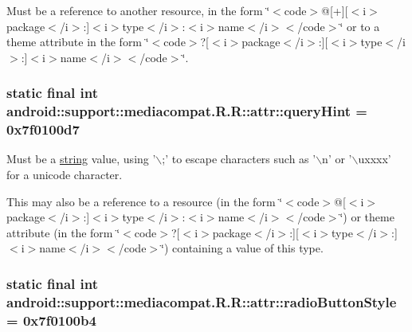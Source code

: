 Must be a reference to another resource, in the form \char`\"{}$<$code$>$@\mbox{[}+\mbox{]}\mbox{[}$<$i$>$package$<$/i$>$:\mbox{]}$<$i$>$type$<$/i$>$:$<$i$>$name$<$/i$>$$<$/code$>$\char`\"{} or to a theme attribute in the form \char`\"{}$<$code$>$?\mbox{[}$<$i$>$package$<$/i$>$:\mbox{]}\mbox{[}$<$i$>$type$<$/i$>$:\mbox{]}$<$i$>$name$<$/i$>$$<$/code$>$\char`\"{}. \hypertarget{classandroid_1_1support_1_1mediacompat_1_1_r_1_1attr_70d39ad74f326eb709e154ea70cea27a}{
\subsubsection[{queryHint}]{\setlength{\rightskip}{0pt plus 5cm}static final int android::support::mediacompat.R.R::attr::queryHint = 0x7f0100d7}}
\label{classandroid_1_1support_1_1mediacompat_1_1_r_1_1attr_70d39ad74f326eb709e154ea70cea27a}


Must be a \hyperlink{classandroid_1_1support_1_1mediacompat_1_1_r_1_1string}{string} value, using '$\backslash$;' to escape characters such as '$\backslash$n' or '$\backslash$uxxxx' for a unicode character. 

This may also be a reference to a resource (in the form \char`\"{}$<$code$>$@\mbox{[}$<$i$>$package$<$/i$>$:\mbox{]}$<$i$>$type$<$/i$>$:$<$i$>$name$<$/i$>$$<$/code$>$\char`\"{}) or theme attribute (in the form \char`\"{}$<$code$>$?\mbox{[}$<$i$>$package$<$/i$>$:\mbox{]}\mbox{[}$<$i$>$type$<$/i$>$:\mbox{]}$<$i$>$name$<$/i$>$$<$/code$>$\char`\"{}) containing a value of this type. \hypertarget{classandroid_1_1support_1_1mediacompat_1_1_r_1_1attr_2d6fd2aff9ef92f58d395bc6fa421325}{
\subsubsection[{radioButtonStyle}]{\setlength{\rightskip}{0pt plus 5cm}static final int android::support::mediacompat.R.R::attr::radioButtonStyle = 0x7f0100b4}}
\label{classandroid_1_1support_1_1mediacompat_1_1_r_1_1attr_2d6fd2aff9ef92f58d395bc6fa421325}


